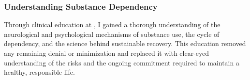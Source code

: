 \subsubsection{Understanding Substance Dependency}
Through clinical education at \RehabProgram, I gained a thorough understanding of the neurological and psychological mechanisms of substance use, the cycle of dependency, and the science behind sustainable recovery. This education removed any remaining denial or minimization and replaced it with clear-eyed understanding of the risks and the ongoing commitment required to maintain a healthy, responsible life.

\vspace{0.5em}
\rehabtable
